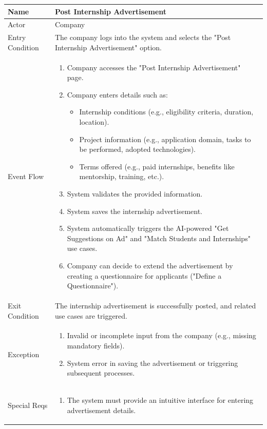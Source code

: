 \begin{table}[H]
\centering
\begin{tabular}{|l|p{12cm}|}
\hline
Name             & Post Internship Advertisement \\ \hline
Actor            & Company \\ \hline
Entry Condition  & The company logs into the system and selects the "Post Internship Advertisement" option. \\ \hline
Event Flow       & 
\begin{enumerate}
    \item Company accesses the "Post Internship Advertisement" page.
    \item Company enters details such as:
    \begin{itemize}
        \item Internship conditions (e.g., eligibility criteria, duration, location).
        \item Project information (e.g., application domain, tasks to be performed, adopted technologies).
        \item Terms offered (e.g., paid internships, benefits like mentorship, training, etc.).
    \end{itemize}
    \item System validates the provided information.
    \item System saves the internship advertisement.
    \item System automatically triggers the AI-powered "Get Suggestions on Ad" and "Match Students and Internships" use cases.
    \item Company can decide to extend the advertisement by creating a questionnaire for applicants ("Define a Questionnaire").
\end{enumerate} \\ \hline
Exit Condition   & The internship advertisement is successfully posted, and related use cases are triggered. \\ \hline
Exception        & 
\begin{enumerate}
    \item Invalid or incomplete input from the company (e.g., missing mandatory fields).
    \item System error in saving the advertisement or triggering subsequent processes.
\end{enumerate} \\ \hline
Special Reqs     & 
\begin{enumerate}
    \item The system must provide an intuitive interface for entering advertisement details.

\end{enumerate}
\end{tabular}
\end{table}
